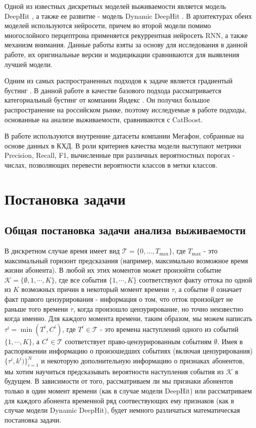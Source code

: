 \documentclass{article}
\begin{document}
Одной из известных дискретных моделей выживаемости является модель DeepHit \cite{Lee2018}, а также ее развитие - модель Dynamic DeepHit \cite{Lee2020}. В архитектурах обеих моделей используются нейросети, причем во второй модели помимо многослойного перцептрона применяется рекуррентная нейросеть RNN, а также механизм внимания. Данные работы взяты за основу для исследования в данной работе, их оригинальные версии и модицикации сравниваются для выявления лучшей модели.

Одним из самых распространенных подходов к задаче является градиентый бустинг \cite{Ahmad2019}.  В данной работе в качестве базового подхода рассматривается категориальный бустинг от компании Яндекс \cite{Dorogush2018}. Он получил большое распространение на российском рынке, поэтому исследуемые в работе подходы, основанные на анализе выживаемости, сравниваются с CatBoost.

В работе используются внутренние датасеты компании Мегафон, собранные на основе данных в КХД. В роли критериев качества модели выступают метрики Precision, Recall, F1, вычисленные при различных вероятностных порогах - числах, позволяющих перевести вероятности классов в метки классов.
\section{Постановка задачи}

\subsection{Общая постановка задачи анализа выживаемости}

В дискретном случае время имеет вид $\mathcal{T}=\{0,\ldots,T_{\max}\}$, где $T_{\max}$ - это максимальный горизонт предсказания (например, максимально возможное время жизни абонента). В любой их этих моментов может произойти событие $\mathcal{K}=\{\emptyset,1,\cdots,K\}$, где все события $\{1,\cdots,K\}$ соответствуют факту оттока по одной из $K$ возможных причин в некоторый момент времени $\tau$, а событие $\emptyset$ означает факт правого цензурирования - информация о том, что отток произойдет не раньше того времени $\tau$, когда произошло цензурирование, но точно неизвестно когда именно. Для каждого момента времени, таким образом, мы можем написать $\tau^i=\min(T^i,C^i)$, где $T^{i}\in\mathcal{T}$ - это времена наступлений одного из событий $\{1,\cdots,K\}$, а $C^{i}\in\mathcal{T}$ соответствует право-цензурированным событиям $\emptyset$. Имея в распоряжении информацию о произошедших событиях (включая цензурирования) $\{\tau^{i},k^{i})\}_{i=1}^{N}$ и некоторую дополнительную информацию о признаках абонентов, мы хотим научиться предсказывать вероятности наступления события из $\mathcal{K}$ в будущем. В зависимости от того, рассматриваем ли мы признаки абонентов только в один момент времени (как в случае модели DeepHit) или рассматриваем для каждого абонента временной ряд соотвествующих ему признаков (как в случае модели Dynamic DeepHit), будет немного различаться математическая постановка задачи. 
\end{document}
